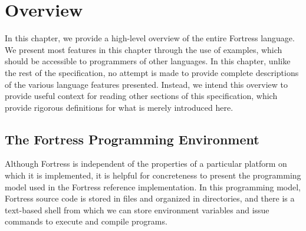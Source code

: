 %
%
%
%

\chapter{Overview}



In this chapter, we provide a high-level overview of the entire Fortress
language. We present most features in this chapter through the use of examples,
which should be accessible to programmers of other languages.
In this chapter, unlike the rest of the specification,
no attempt is made to provide complete descriptions
of the various language features presented. Instead, we intend this overview to
provide useful context for reading other sections of this specification,
which provide rigorous definitions for what is merely
introduced here.

\section{The Fortress Programming Environment}

Although Fortress is independent of the properties of a particular
platform on which it is implemented, it is helpful for concreteness
to present the programming model used in the Fortress reference implementation.
In this programming model,
Fortress source code is stored in files and organized in
directories, and there is a text-based shell from which we can store
environment variables and issue commands to execute and compile
programs.

